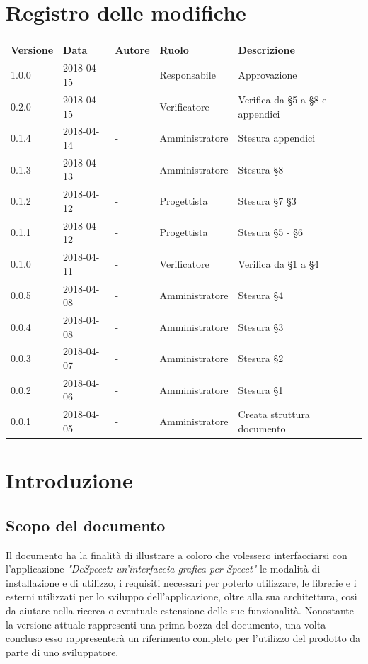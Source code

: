 \documentclass[openany,12pt,a4paper]{report}
\begin{document}
	\chapter*{Registro delle modifiche}
	\setlength\LTleft{-22mm}
	\begin{longtable}{|p{20mm}|p{20mm}|p{40mm}|p{30mm}|p{50mm}|}
		\hline
		\textbf{Versione} & \textbf{Data} & \textbf{Autore} & \textbf{Ruolo} & \textbf{Descrizione} \\
		
		\hline 1.0.0 & 2018-04-15 &  & Responsabile & Approvazione \\
		\hline 0.2.0 & 2018-04-15 & - & Verificatore & Verifica da §5 a §8 e appendici \\
		\hline 0.1.4 & 2018-04-14 & - & Amministratore & Stesura appendici \\
		\hline 0.1.3 & 2018-04-13 & - & Amministratore & Stesura §8 \\
		\hline 0.1.2 & 2018-04-12 & - & Progettista & Stesura §7 §3 \\		
		\hline 0.1.1 & 2018-04-12 & - & Progettista & Stesura §5 - §6 \\
		\hline 0.1.0 & 2018-04-11 & - & Verificatore & Verifica da §1 a §4 \\
		\hline 0.0.5 & 2018-04-08 & - & Amministratore & Stesura §4 \\	
		\hline 0.0.4 & 2018-04-08 & - & Amministratore & Stesura §3 \\
		\hline 0.0.3 & 2018-04-07 & - & Amministratore & Stesura §2 \\
		\hline 0.0.2 & 2018-04-06 & - & Amministratore & Stesura §1 \\
		\hline 0.0.1 & 2018-04-05 & - & Amministratore & Creata struttura documento \\
		\hline
		
	\end{longtable}
	
	
	\tableofcontents
	
	
	\chapter{Introduzione}
	
	\section{Scopo del documento}
	
	Il documento ha la finalità di illustrare a coloro che volessero interfacciarsi con l’applicazione
	\textit{"DeSpeect: un'interfaccia grafica per Speect"} le modalità di installazione e di utilizzo, i requisiti necessari per poterlo utilizzare, le librerie e i  esterni utilizzati per lo sviluppo dell’applicazione,
	oltre alla sua architettura, così da aiutare
	nella ricerca o eventuale estensione delle sue funzionalità. Nonostante la versione attuale rappresenti una prima bozza del documento, una volta concluso esso rappresenterà un riferimento completo per l’utilizzo del prodotto da parte di uno sviluppatore.
	
\end{document}
